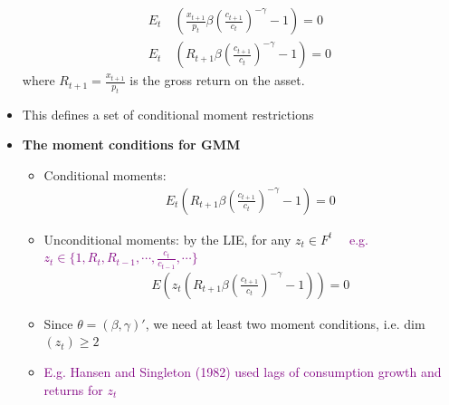\documentclass[a4paper,twoside,11pt]{article}
\begin{document}
\begin{itemize}
\begin{equation*}
\begin{aligned}
E_t & \ ( \frac{x_{t+1}}{p_t} \beta (\frac{c_{t+1}}{c_t})^{-\gamma} -1 ) = 0 \\
E_t & \ (R_{t+1} \beta (\frac{c_{t+1}}{c_t})^{-\gamma} -1) = 0
\end{aligned} 
\end{equation*}
where $R_{t+1} = \frac{x_{t+1}}{p_t}$ is the gross return on the asset.
    \item This defines a set of conditional moment restrictions 
    \item \textbf{The moment conditions for GMM}
    \begin{itemize}
        \item Conditional moments:
\begin{equation*}
\begin{aligned}
E_t (R_{t+1} \beta (\frac{c_{t+1}}{c_t})^{-\gamma}-1) = 0
\end{aligned} 
\end{equation*}
        \item Unconditional moments: by the LIE, for any $z_t \in F^t$ \ \ \textcolor{Purple}{e.g. $z_t \in \{ 1, R_t, R_{t-1}, \cdots, \frac{c_t}{c_{t-1}},\cdots \}$}
\begin{equation*}
\begin{aligned}
E(z_t (R_{t+1} \beta (\frac{c_{t+1}}{c_t})^{-\gamma} -1 )) = 0
\end{aligned} 
\end{equation*}
        \item Since $\theta = (\beta, \gamma)'$, we need at least two moment conditions, i.e. dim$(z_t) \ge 2$
        \item \textcolor{Purple}{E.g. Hansen and Singleton (1982) used lags of consumption growth and returns for $z_t$}
    \end{itemize}
\end{itemize}
\end{document}
